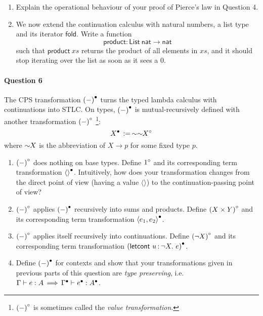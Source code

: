 \documentclass[11pt,a4paper,twoside]{article}
\begin{document}
\begin{enumerate}[label=(\alph*)]
  \item Explain the operational behaviour of your proof of Pierce's law in Question 4.

  \item We now extend the continuation calculus with natural numbers, a list type and its iterator $\mathsf{fold}$.
  Write a function
    \[\mathsf{product} : \mathsf{List}\ \mathsf{nat} \to \mathsf{nat}\]
  such that $\mathsf{product}\ xs$ returns the product of all elements in $xs$, 
  and it should stop iterating over the list as soon as it sees a $0$.
\end{enumerate}

\paragraph{Question 6} The CPS transformation ${(-)}^{\bullet}$
turns the typed lambda calculus with continuations into STLC.
On types, ${(-)}^{\bullet}$ is mutual-recursively defined with another transformation ${(-)}^{\circ}$
\footnote{${(-)}^{\circ}$ is sometimes called the \emph{value transformation}.}:
  \[
    {X}^{\bullet} \,:=\, \sim\sim\!\!{X}^{\circ}
  \]
where $\sim\!\!X$ is the abbreviation of $X \to p$ for some fixed type $p$.
\begin{enumerate}[label=(\alph*)]
  \item ${(-)}^{\circ}$ does nothing on base types. Define ${1}^{\circ}$ 
  and its corresponding term transformation ${\langle\rangle}^{\bullet}$.
  Intuitively, how does your transformation changes from the direct point of view
  (having a value $\langle\rangle$)
  to the continuation-passing point of view?

  \item ${(-)}^{\circ}$ applies ${(-)}^{\bullet}$ recursively into sums and products. Define ${(X \times Y)}^{\circ}$ 
  and its corresponding term transformation ${\langle e_1, e_2\rangle}^{\bullet}$.

  \item ${(-)}^{\circ}$ applies itself recursively into continuations. Define ${(\neg X)}^{\circ}$ 
  and its corresponding term transformation $\Tdot{\mathsf{(letcont}\ \var{u}{\neg X}.\ e)}$.

  \item Define ${(-)}^{\bullet}$ for contexts and show that your transformations given in previous parts of this question
  are \emph{type preserving}, i.e.~$\Gamma \vdash e : A \,\Longrightarrow\, {\Gamma}^{\bullet} \vdash {e}^{\bullet} : {A}^{\bullet}$.
\end{enumerate}
\end{document}
